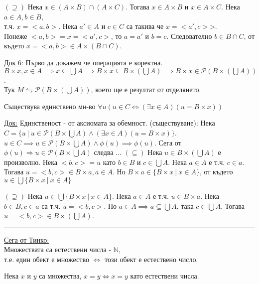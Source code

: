 \documentclass[fleqn, titlepage, 12pt]{report}
\begin{document}
$(\supseteq)$ Нека $x \in (A \times  B) \cap (A \times C)$. Тогава $x \in A \times B$ и $x \in A \times C$. Нека
$a \in A, b \in B$,\\
т.ч. $x = <a,b>$. Нека $a' \in A $ и $ c \in C$ са такива че $x = <a',c>$>.\\
Понеже $<a,b> = x = <a',c>$, то $a = a'$ и $b = c$.
Следователно $b \in B \cap C$, от където $x = <a,b> \in A \times (B \cap C)$.
\bigbreak

\underline{Док 6:} Първо да докажем че операцията е коректна.\\
$B \times x, x \in A \implies x \subseteq \bigcup{A} \implies B \times x \subseteq B \times (\bigcup A) \implies B \times x \in \mathcal{P}(B \times (\bigcup A)) $.\\
Тук $M \leftrightharpoons \mathcal{P}(B \times (\bigcup A))$, което ще е резултат от отделянето.
\bigbreak

 Съществува единствено мн-во $ \forall{u} (u \in C \Leftrightarrow ( \exists{x} \in A)(u = B \times x)) $
\bigbreak

\underline{Док:} Единственост - от аксиомата за обемност.
\bigbreak
(съществуване): Нека $C = \{u\ |\ u \in \mathcal{P}(B \times \bigcup A) \land ( \exists{x \in A})(u = B \times x) \}$.\\
$u \in C \implies u \in \mathcal{P}(B \times  \bigcup{A} ) \land \phi(u) \implies \phi(u)  $. Сега от $ \phi(u) \Rightarrow u \in \mathcal{P}(B \times  \bigcup{A} )$ следва ...
\bigbreak
$( \subseteq)$ Нека $ u \in B \times ( \bigcup{A} )$ е произволно. Нека $<b,c> = u$ като $b \in B$ и $c \in \bigcup{A} $.
Нека $a \in A$ е т.ч. $c \in a$. Тогава $u = <b,c> \in B \times a, a \in A$. Но $B \times a \in \{B \times x\ |\ x \in A\}$, от където $u \in \bigcup{ \{B \times x\ |\ x \in A\}} $
\bigbreak

$(\supseteq)$ Нека $u \in \bigcup{ \{B \times x\ |\ x \in A\}} $. Нека $a \in A$ е т.ч. $u \in B \times a$.
Нека $b \in B, c \in a$ са т.ч. $u = <b,c>$. Но $a \in A \implies a \subseteq \bigcup{A}$, така $c \in \bigcup{A} $.
Тогава $u = <b,c> \in B \times ( \bigcup{A} )$.
\bigbreak

\hrule
\bigbreak
\underline{Сега от Тинко:}\\
Множествата са естествени числа - $\mathbb{N}$,\\
т.е. един обект е множество $\Longleftrightarrow $ този обект е естествено число.
\bigbreak

Нека $ x $ и $ y $ са множества, $x = y \Longleftrightarrow x = y$ като естествени числа.
\bigbreak
\end{document}
